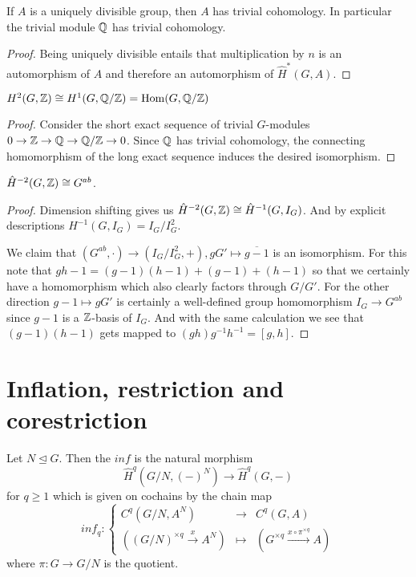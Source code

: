 \documentclass[fontsize=11pt,fleqn,a4paper]{scrartcl}
\begin{document}
\begin{corollary}
If $A$ is a uniquely divisible group, then $A$ has trivial cohomology. In particular the trivial module $\mathbb{Q}$ has trivial cohomology.
\end{corollary}
\begin{proof}
Being uniquely divisible entails that multiplication by $n$ is an automorphism of $A$ and therefore an automorphism of $\hat{H}^\ast(G,A)$.
\end{proof}

\begin{corollary}[$H^1$ and $H^2$]
$H^2(G,\mathbb{Z}) \cong H^1(G,\mathbb{Q}/\mathbb{Z}) = \operatorname{Hom}(G,\mathbb{Q}/\mathbb{Z})$
\end{corollary}
\begin{proof}
Consider the short exact sequence of trivial $G$-modules
$0\to\mathbb{Z}\to\mathbb{Q}\to\mathbb{Q}/\mathbb{Z}\to 0$.
Since $\mathbb{Q}$ has trivial cohomology, the connecting homomorphism of the long exact sequence induces the desired isomorphism.
\end{proof}

\begin{theorem}[$\hat{H}^{-2}$]
$\hat{H}^{-2}(G,\mathbb{Z}) \cong G^{ab}$.
\end{theorem}
\begin{proof}
Dimension shifting gives us $\hat{H}^{-2}(G,\mathbb{Z}) \cong \hat{H}^{-1}(G,I_G)$. And by explicit descriptions $H^{-1}(G,I_G) = I_G/I_G^2$.

We claim that $(G^{ab},\cdot) \to (I_G/I_G^2,+), gG'\mapsto \overline{g-1}$ is an isomorphism. For this note that $gh-1 = (g-1)(h-1) + (g-1) + (h-1)$ so that we certainly have a homomorphism which also clearly factors through $G/G'$. For the other direction $g-1 \mapsto gG'$ is certainly a well-defined group homomorphism $I_G \to G^{ab}$ since $g-1$ is a $\mathbb{Z}$-basis of $I_G$. And with the same calculation we see that $(g-1)(h-1)$ gets mapped to $(gh)g^{-1}h^{-1} = [g,h]$.
\end{proof}

\section{Inflation, restriction and corestriction}

\begin{lemmadef}[Inflation]
Let $N\unlhd G$. Then the  $inf$ is the natural morphism
\[\hat{H}^q(G/N,(-)^N) \to \hat{H}^q(G,-)\]
for $q\geq 1$ which is given on cochains by the chain map
\[inf_q: \left\{\begin{array}{rcl}
C^q(G/N,A^N) &\to& C^q(G,A) \\
((G/N)^{\times q} \xrightarrow{x} A^N) &\mapsto& (G^{\times q}\xrightarrow{x\circ\pi^{\times q}} A)
\end{array}\right.\]
where $\pi: G\to G/N$ is the quotient.
\end{lemmadef}
\end{document}
